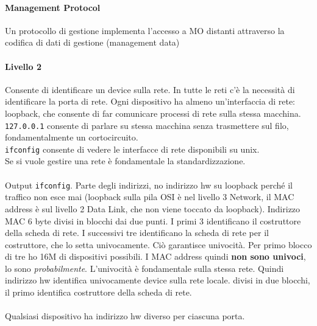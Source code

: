 \documentclass[10pt]{book}
\begin{document}
\paragraph{Management Protocol} Un protocollo di gestione implementa l'accesso a MO distanti attraverso la codifica di dati di gestione (management data)
\paragraph{Livello 2} Consente di identificare un device sulla rete. In tutte le reti c'è la necessità di identificare la porta di rete. Ogni dispositivo ha almeno un'interfaccia di rete: loopback, che consente di far comunicare processi di rete sulla stessa macchina. \texttt{127.0.0.1} consente di parlare su stessa macchina senza trasmettere sul filo, fondamentalmente un cortocircuito.\\
\texttt{ifconfig} consente di vedere le interfacce di rete disponibili su unix.\\
Se si vuole gestire una rete è fondamentale la standardizzazione.\\\\
Output \texttt{ifconfig}. Parte degli indirizzi, no indirizzo hw su loopback perché il traffico non esce mai (loopback sulla pila OSI è nel livello 3 Network, il MAC address è sul livello 2 Data Link, che non viene toccato da loopback). Indirizzo MAC 6 byte divisi in blocchi dai due punti. I primi 3 identificano il costruttore della scheda di rete. I successivi tre identificano la scheda di rete per il costruttore, che lo setta univocamente. Ciò garantisce univocità. Per primo blocco di tre ho 16M di dispositivi possibili. I MAC address quindi \textbf{non sono univoci}, lo sono \textit{probabilmente}. L'univocità è fondamentale sulla stessa rete. Quindi indirizzo hw identifica univocamente device sulla rete locale. divisi in due blocchi, il primo identifica costruttore della scheda di rete.\\\\
Qualsiasi dispositivo ha indirizzo hw diverso per ciascuna porta.
\end{document}
